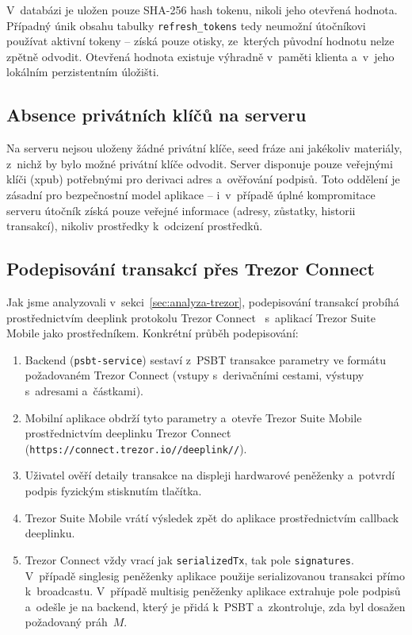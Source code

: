 V~databázi je uložen pouze SHA-256 hash tokenu, nikoli jeho otevřená
hodnota. Případný únik obsahu tabulky \texttt{refresh\_tokens} tedy
neumožní útočníkovi používat aktivní tokeny -- získá pouze otisky,
ze~kterých původní hodnotu nelze zpětně odvodit. Otevřená hodnota
existuje výhradně v~paměti klienta a~v~jeho lokálním perzistentním
úložišti.

\subsection{Absence privátních klíčů na serveru}

Na serveru nejsou uloženy žádné privátní klíče, seed fráze ani jakékoliv
materiály, z~nichž by bylo možné privátní klíče odvodit. Server disponuje
pouze veřejnými klíči (xpub) potřebnými pro derivaci adres a~ověřování
podpisů. Toto oddělení je zásadní pro bezpečnostní model aplikace --
i~v~případě úplné kompromitace serveru útočník získá pouze veřejné informace
(adresy, zůstatky, historii transakcí), nikoliv prostředky k~odcizení
prostředků.

\subsection{Podepisování transakcí přes Trezor Connect}
\label{subsec:trezor-connect}

Jak jsme analyzovali v~sekci~\ref{sec:analyza-trezor}, podepisování
transakcí probíhá prostřednictvím deeplink protokolu Trezor
Connect~\cite{TrezorConnect} s~aplikací Trezor Suite Mobile jako
prostředníkem. Konkrétní průběh podepisování:

\begin{enumerate}
\item Backend (\texttt{psbt-service}) sestaví z~PSBT transakce parametry
  ve formátu požadovaném Trezor Connect (vstupy s~derivačními cestami,
  výstupy s~adresami a~částkami).
\item Mobilní aplikace obdrží tyto parametry a~otevře Trezor Suite Mobile
  prostřednictvím deeplinku Trezor Connect
  (\texttt{https://\allowbreak connect.\allowbreak trezor.\allowbreak io//\allowbreak deeplink//}).
\item Uživatel ověří detaily transakce na displeji hardwarové peněženky
  a~potvrdí podpis fyzickým stisknutím tlačítka.
\item Trezor Suite Mobile vrátí výsledek zpět do aplikace prostřednictvím
  callback deeplinku.
\item Trezor Connect vždy vrací jak \texttt{serializedTx}, tak pole
  \texttt{signatures}. V~případě singlesig peněženky aplikace použije
  serializovanou transakci přímo k~broadcastu. V~případě multisig peněženky
  aplikace extrahuje pole podpisů a~odešle je na backend, který je přidá
  k~PSBT a~zkontroluje, zda byl dosažen požadovaný práh~$M$.
\end{enumerate}

